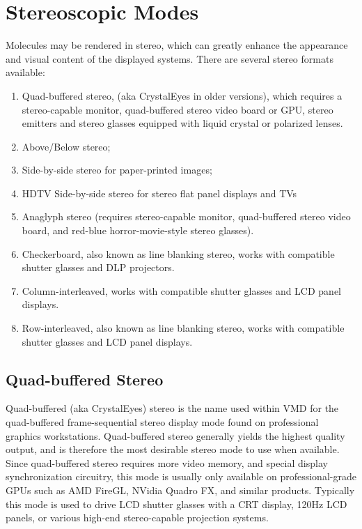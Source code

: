 \section{Stereoscopic Modes}
Molecules may be rendered in stereo, which can greatly enhance
the appearance and visual content of the displayed systems.  There are
several stereo formats available:
\begin{enumerate}
  \item Quad-buffered stereo, (aka CrystalEyes in older versions), 
        which requires a stereo-capable monitor, 
        quad-buffered stereo video board or GPU, 
        stereo emitters and stereo glasses equipped with 
        liquid crystal or polarized lenses.
  \item Above/Below stereo;
  \item Side-by-side stereo for paper-printed images;
  \item HDTV Side-by-side stereo for stereo flat panel displays and TVs
  \item Anaglyph stereo (requires stereo-capable monitor, 
        quad-buffered stereo video board, 
        and red-blue horror-movie-style stereo glasses).
  \item Checkerboard, also known as line blanking stereo,
        works with compatible shutter glasses and DLP projectors.
  \item Column-interleaved,
        works with compatible shutter glasses and LCD panel displays.
  \item Row-interleaved, also known as line blanking stereo,
        works with compatible shutter glasses and LCD panel displays.
\end{enumerate}

\subsection{Quad-buffered Stereo}
Quad-buffered (aka CrystalEyes) stereo is the name used within VMD for the 
quad-buffered frame-sequential stereo display mode found on 
professional graphics workstations.  Quad-buffered stereo generally yields
the highest quality output, and is therefore the most desirable stereo
mode to use when available.  Since quad-buffered stereo requires more 
video memory, and special display synchronization circuitry, this mode
is usually only available on professional-grade GPUs such as 
AMD FireGL, NVidia Quadro FX, and similar products.
Typically this 
mode is used to drive LCD shutter glasses with a CRT display,
120Hz LCD panels, or various high-end stereo-capable projection systems.

